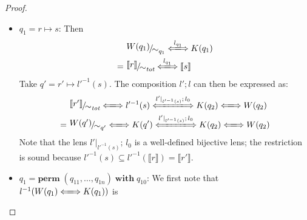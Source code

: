 \documentclass[a4paper,11pt] {article}
\theoremstyle{definition}
\newcommand{\lensbetween}[1]{\xLongleftrightarrow{#1}}
\newcommand{\perm}{ \textbf{perm}\; }
\newcommand{\with}{ \;\textbf{with}\; }
\newcommand{\niceFrac}[2]{%
    \raise.5ex\hbox{$#1$}%
    \kern-.1em/\kern-.15em%
    \lower.25ex\hbox{$#2$}}
\begin{document}
\begin{proof}
\begin{itemize}
  \item $q_1 = r \mapsto s$:
    Then 
    \begin{align*}
      &\niceFrac{W(q_1)}{\sim_{q_1}}
      \lensbetween{l_{q_1}} K(q_1) \\
      =~& \niceFrac{\llbracket r \rrbracket}{\sim_\textit{tot}}
      \lensbetween{l_{q_1}} \llbracket s \rrbracket \\
    \end{align*}
    Take $q' = r' \mapsto l'^{-1}(s)$.
    The composition $l'; l$ can then be expressed as:
    \begin{align*}
      &\niceFrac{\llbracket r' \rrbracket}{\sim_{\textit{tot}}}
        \lensbetween{}
        l'^{-1}(s) \lensbetween{l' |_{l'^{-1}(s)} ; \, l_0} K(q_2)
      \lensbetween{} W(q_2) \\
      =~&
      \niceFrac{W(q')}{\sim_{q'}} \lensbetween{}
      K(q') \lensbetween{l' |_{l'^{-1}(s)} ; \, l_0} K(q_2)
      \lensbetween{} W(q_2)
    \end{align*}
    Note that the lens $l' |_{l'^{-1}(s)}; \, l_0$ is a well-defined
    bijective lens; the restriction is sound because
    $l'^{-1}(s) \subseteq l'^{-1}(\llbracket r \rrbracket) =
    \llbracket r' \rrbracket$.
  \item $q_1 = \perm(q_{11}, \ldots, q_{1n}) \with q_{10}$:
    We first note that $l^{-1}(W(q_1) \lensbetween{} K(q_1))$ is 

    \begin{comment}
    Let $q' = \perm(l^{-1}(W(q_{11})), \ldots, l^{-1}(q_{1n})) \with l^{-1}(q_{10})$.
    \begin{align*}
      \llbracket r \rrbracket
      = W(\perm(l^{-1}(q_{11}), \ldots, l^{-1}(q_{1n})) \with l^{-1}(q_{10}))
    \end{align*}
    and 
    \end{comment}

  \end{itemize}
\end{proof}
\end{document}

